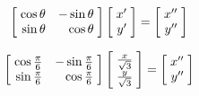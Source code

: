 \documentclass[a4paper]{article}
\begin{document}
\begin{enumerate}[label=\textbf{\arabic*.}]
\begin{enumerate}
		\begin{equation*}
		\begin{bmatrix*}[r]
			\hspace{1mm} \cos{\theta} & -\sin{\theta} \hspace{1mm}\\
			\hspace{1mm} \sin{\theta} & \cos{\theta} \hspace{1mm}\\
		\end{bmatrix*}
		\begin{bmatrix*}[r]
			\hspace{1mm} x^{\prime} \hspace{1mm}\\
			\hspace{1mm} y^{\prime} \hspace{1mm}\\
		\end{bmatrix*}
		=
		\begin{bmatrix*}[r]
			\hspace{1mm} x^{\prime \prime} \hspace{1mm}\\
			\hspace{1mm} y^{\prime \prime} \hspace{1mm}\\
		\end{bmatrix*}
		\end{equation*}

		\begin{equation*}
		\begin{bmatrix*}[r]
			\hspace{1mm} \cos{\frac{\pi}{6}} & -\sin{\frac{\pi}{6}} \hspace{1mm}\\
			\hspace{1mm} \sin{\frac{\pi}{6}} & \cos{\frac{\pi}{6}} \hspace{1mm}\\
		\end{bmatrix*}
		\begin{bmatrix*}[r]
			\hspace{1mm} \frac{x}{\sqrt{3}} \hspace{1mm}\\
			\hspace{1mm} \frac{y}{\sqrt{3}} \hspace{1mm}\\
		\end{bmatrix*}
		=
		\begin{bmatrix*}[r]
			\hspace{1mm} x^{\prime \prime} \hspace{1mm}\\
			\hspace{1mm} y^{\prime \prime} \hspace{1mm}\\
		\end{bmatrix*}
		\end{equation*}


\end{enumerate}
\end{enumerate}
\end{document}
